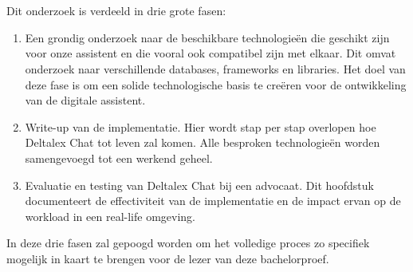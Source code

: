 
\chapter{}%
\label{ch:methodologie}

Dit onderzoek is verdeeld in drie grote fasen:

\begin{enumerate}
	\item Een grondig onderzoek naar de beschikbare technologieën die geschikt zijn voor onze assistent en die vooral ook compatibel zijn met elkaar.
	      Dit omvat onderzoek naar verschillende databases, frameworks en libraries.
	      Het doel van deze fase is om een solide technologische basis te creëren voor de ontwikkeling van de digitale assistent.
	\item Write-up van de implementatie. Hier wordt stap per stap overlopen hoe Deltalex Chat tot leven zal komen.
	      Alle besproken technologieën worden samengevoegd tot een werkend geheel.
	\item Evaluatie en testing van Deltalex Chat bij een advocaat.
	      Dit hoofdstuk documenteert de effectiviteit van de implementatie en de impact ervan op de workload in een real-life omgeving.
\end{enumerate}

In deze drie fasen zal gepoogd worden om het volledige proces zo specifiek mogelijk in kaart te brengen voor de lezer van deze bachelorproef. 



